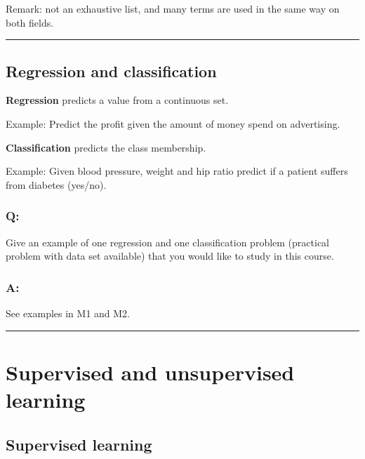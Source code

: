 \documentclass[]{article}
\begin{document}
Remark: not an exhaustive list, and many terms are used in the same way
on both fields.

\begin{center}\rule{0.5\linewidth}{\linethickness}\end{center}

\hypertarget{regression-and-classification}{%
\subsection{Regression and
classification}\label{regression-and-classification}}

\textbf{Regression} predicts a value from a continuous set.

Example: Predict the profit given the amount of money spend on
advertising.

\textbf{Classification} predicts the class membership.

Example: Given blood pressure, weight and hip ratio predict if a patient
suffers from diabetes (yes/no).

\hypertarget{q}{%
\subsubsection{Q:}\label{q}}

Give an example of one regression and one classification problem
(practical problem with data set available) that you would like to study
in this course.

\hypertarget{a-2}{%
\subsubsection{A:}\label{a-2}}

See examples in M1 and M2.

\begin{center}\rule{0.5\linewidth}{\linethickness}\end{center}

\hypertarget{supervised-and-unsupervised-learning}{%
\section{Supervised and unsupervised
learning}\label{supervised-and-unsupervised-learning}}

\hypertarget{supervised-learning}{%
\subsection{Supervised learning}\label{supervised-learning}}
\end{document}
